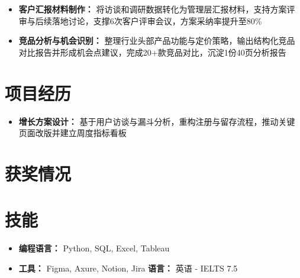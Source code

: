 \documentclass{resume}
\begin{document}
\begin{Form}
\vspace{-2pt}
\begin{itemize}
    \item \textbf{客户汇报材料制作：} 将访谈和调研数据转化为管理层汇报材料，支持方案评审与后续落地讨论，支撑6次客户评审会议，方案采纳率提升至80\%
    \item \textbf{竞品分析与机会识别：} 整理行业头部产品功能与定价策略，输出结构化竞品对比报告并形成机会点建议，完成20+款竞品对比，沉淀1份40页分析报告
\end{itemize}
\vspace{-2pt}

\section{项目经历}
\vspace{-2pt}
\begin{itemize}
    \item \textbf{增长方案设计：} 基于用户访谈与漏斗分析，重构注册与留存流程，推动关键页面改版并建立周度指标看板
\end{itemize}
\vspace{-2pt}

\section{获奖情况}
\vspace{1pt}
\vspace{-2pt}

\section{技能}
\begin{itemize}[parsep=0.5ex]
    \item \textbf{编程语言：} Python, SQL, Excel, Tableau
    \item \textbf{工具：} Figma, Axure, Notion, Jira \quad \textbf{语言：} 英语 - IELTS 7.5
\end{itemize}

\end{Form}
\end{document}
